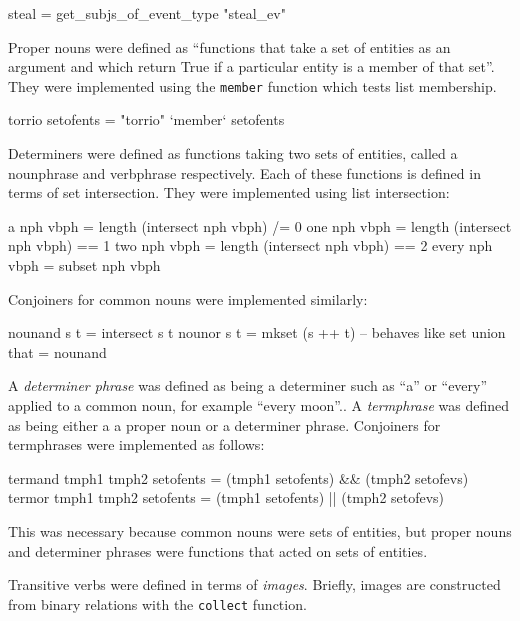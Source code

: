 \documentclass[../main.tex]{subfiles}
\begin{document}
\begin{code}
	steal = get_subjs_of_event_type "steal_ev"
\end{code}

Proper nouns were defined as ``functions that take a set of entities as an
argument and which return True if a particular entity is a member of that
set''\cite{frost2014denotational}.  They were implemented using the
\texttt{member} function which tests list membership.

\begin{code}
	torrio setofents  = "torrio" `member` setofents
\end{code}

Determiners were defined as functions taking two sets of entities, called
a nounphrase and verbphrase respectively.  Each of these functions
is defined in terms of set intersection.  They were implemented using
list intersection:

\begin{code}
  a     nph vbph     = length (intersect nph vbph) /= 0
  one   nph vbph     = length (intersect nph vbph)  == 1
  two   nph vbph     = length (intersect nph vbph)  == 2
  every nph vbph     = subset  nph vbph
\end{code}

Conjoiners for common nouns were implemented similarly:

\begin{code}
  nounand s t  = intersect s t
  nounor  s t  = mkset (s ++ t) -- behaves like set union
  that         = nounand
\end{code}


A {\em determiner phrase} was defined as being a determiner such as ``a'' or ``every'' applied to a common noun, for example ``every moon''.\cite{frost2014denotational}.
A {\em termphrase} was defined as being either a a proper noun or a determiner phrase\cite{frost2014denotational}.
Conjoiners for termphrases were implemented as follows:
\vspace{1em}
\begin{code}
 termand tmph1 tmph2 setofents = (tmph1 setofents) && (tmph2 setofevs)
 termor  tmph1 tmph2 setofents = (tmph1 setofents) || (tmph2 setofevs)
\end{code}
\vspace{1em}
This was necessary because common nouns were sets of entities, but
proper nouns and determiner phrases were functions that acted on sets
of entities.

Transitive verbs were defined in terms of {\em images}\cite{frost2014denotational}.  Briefly, images
are constructed from binary relations with the \texttt{collect} function.
\end{document}
